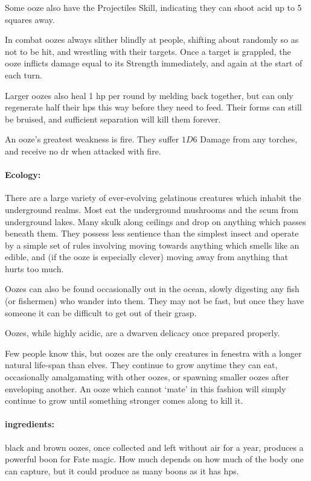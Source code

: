 \begin{multicols}{2}
Some ooze also have the Projectiles Skill, indicating they can shoot acid up to 5 squares away.

In combat oozes always slither blindly at people, shifting about randomly so as not to be hit, and wrestling with their targets.
Once a target is grappled, the ooze inflicts damage equal to its Strength immediately, and again at the start of each turn.

Larger oozes also heal 1 \gls{hp} per round by melding back together, but can only regenerate half their \glspl{hp} this way before they need to feed.
Their forms can still be bruised, and sufficient separation will kill them forever.

An ooze's greatest weakness is fire.
They suffer $1D6$ Damage from any torches, and receive no \gls{dr} when attacked with fire.

\paragraph{Ecology:} There are a large variety of ever-evolving gelatinous creatures which inhabit the underground realms.
Most eat the underground mushrooms and the scum from underground lakes.
Many skulk along ceilings and drop on anything which passes beneath them.
They possess less sentience than the simplest insect and operate by a simple set of rules involving moving towards anything which smells like an edible, and (if the ooze is especially clever) moving away from anything that hurts too much.

Oozes can also be found occasionally out in the ocean, slowly digesting any fish (or fishermen) who wander into them.
They may not be fast, but once they have someone it can be difficult to get out of their grasp.

Oozes, while highly acidic, are a dwarven delicacy once prepared properly.

Few people know this, but oozes are the only creatures in \gls{fenestra} with a longer natural life-span than elves.
They continue to grow anytime they can eat, occasionally amalgamating with other oozes, or spawning smaller oozes after enveloping another.
An ooze which cannot `mate' in this fashion will simply continue to grow until something stronger comes along to kill it.

\jelly

\paragraph{\Glspl{ingredient}:}
black and brown oozes, once collected and left without air for a year, produces a powerful \gls{boon} for Fate magic.
How much depends on how much of the body one can capture, but it could produce as many \glspl{boon} as it has \glspl{hp}.


\end{multicols}

